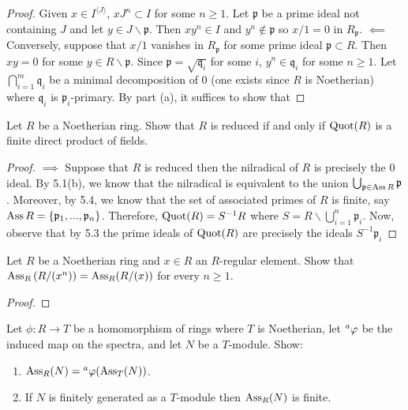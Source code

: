\begin{proof}
Given $x\in I^{\langle J\rangle}$, $xJ^n\subset I$ for some
$n\geq 1$. Let $\mathfrak{p}$ be a prime ideal not containing $J$
and let $y\in J\smallsetminus\mathfrak{p}$. Then $xy^n\in I$ and
$y^n\notin\mathfrak{p}$ so $x/1=0$ in
$R_{\mathfrak{p}}$. $\impliedby$ Conversely, suppose that $x/1$
vanishes in $R_{\mathfrak{p}}$ for some prime ideal
$\mathfrak{p}\subset R$. Then $xy=0$ for some
$y\in R\smallsetminus\mathfrak{p}$. Since
$\mathfrak{p}=\sqrt{\mathfrak{q}_i}$ for some $i$,
$y^n\in\mathfrak{q}_i$ for some $n\geq 1$. Let
$\bigcap_{i=1}^m\mathfrak{q}_i$ be a minimal decomposition of $0$
(one exists since $R$ is Noetherian) where $\mathfrak{q}_i$ is
$\mathfrak{p}_i$-primary. By part (a), it suffices to show that
\end{proof}
\newpage
\begin{problem}
Let $R$ be a Noetherian ring. Show that $R$ is reduced if and
only if $\Quot(R)$ is a finite direct product of fields.
\end{problem}
\begin{proof}
$\implies$ Suppose that $R$ is reduced then the nilradical of $R$ is
precisely the $0$ ideal. By 5.1(b), we know that the nilradical is
equivalent to the union
$\bigcup_{\mathfrak{p}\in\Ass R}\mathfrak{p}$. Moreover, by 5.4, we know
that the set of associated primes of $R$ is finite, say
$\Ass R=\{\mathfrak{p}_1,...,\mathfrak{p}_n\}$. Therefore,
$\Quot(R)=S^{-1}R$ where $S=R\smallsetminus\bigcup_{i=1}^n\mathfrak{p}_i$.
Now, observe that by 5.3 the prime ideals of $\Quot(R)$
are precisely the ideals $S^{-1}\mathfrak{p}_i$
\end{proof}
\newpage
\begin{problem}
Let $R$ be a Noetherian ring and $x\in R$ an $R$-regular
element. Show that $\Ass_R\left(R/(x^n)\right)=\Ass_R(R/(x))$ for
every $n\geq 1$.
\end{problem}
\begin{proof}
\end{proof}
\newpage
\begin{problem}
Let $\phi\colon R\to T$ be a homomorphism of rings where $T$ is
Noetherian, let $\prescript{a}{}\phi$ be the induced map on the spectra,
and let $N$ be a $T$-module. Show:
\begin{enumerate}[label=(\alph*)]
\item $\Ass_R(N)=\prescript{a}{}\phi(\Ass_T(N))$.
\item If $N$ is finitely generated as a $T$-module then
  $\Ass_R(N)$ is finite.
\end{enumerate}
\end{problem}
